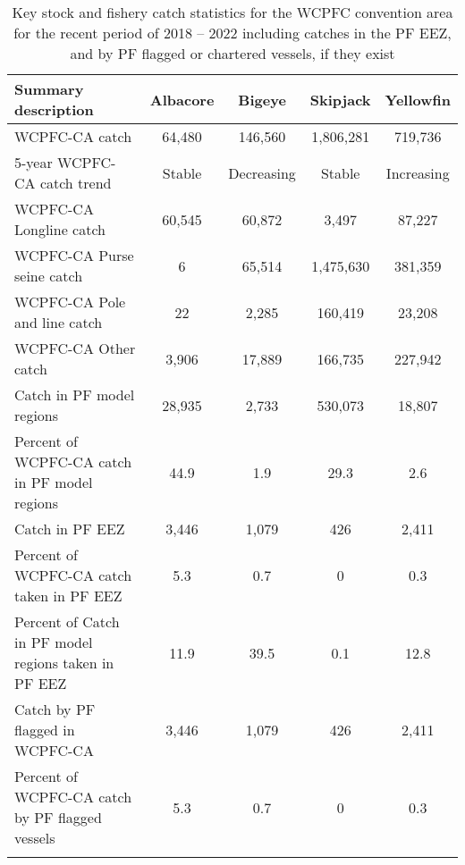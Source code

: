 \begin{longtable}{lcccc}
\caption{Key stock and fishery catch statistics for the WCPFC convention area for the recent period of 2018 -- 2022 including catches in the PF EEZ, and by PF flagged or chartered vessels, if they exist} \\ 
  \hline
Summary description & Albacore & Bigeye & Skipjack & Yellowfin \\ 
  \hline
WCPFC-CA catch & 64,480 & 146,560 & 1,806,281 & 719,736 \\ 
  5-year WCPFC-CA catch trend & Stable & Decreasing & Stable & Increasing \\ 
  WCPFC-CA Longline catch & 60,545 & 60,872 & 3,497 & 87,227 \\ 
  WCPFC-CA Purse seine catch & 6 & 65,514 & 1,475,630 & 381,359 \\ 
  WCPFC-CA Pole and line catch & 22 & 2,285 & 160,419 & 23,208 \\ 
  WCPFC-CA Other catch & 3,906 & 17,889 & 166,735 & 227,942 \\ 
  Catch in PF model regions & 28,935 & 2,733 & 530,073 & 18,807 \\ 
  Percent of WCPFC-CA catch in PF model regions & 44.9 & 1.9 & 29.3 & 2.6 \\ 
   \hline
Catch in PF EEZ & 3,446 & 1,079 & 426 & 2,411 \\ 
  Percent of WCPFC-CA catch taken in PF EEZ & 5.3 & 0.7 & 0 & 0.3 \\ 
  Percent of Catch in PF model regions taken in PF EEZ & 11.9 & 39.5 & 0.1 & 12.8 \\ 
  Catch by PF flagged in WCPFC-CA & 3,446 & 1,079 & 426 & 2,411 \\ 
  Percent of WCPFC-CA catch by PF flagged vessels & 5.3 & 0.7 & 0 & 0.3 \\ 
  \hline
\label{cat_sum_tab}
\end{longtable}
